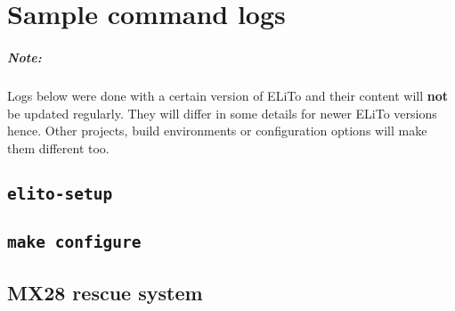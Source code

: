 \chapter{Sample command logs}

\paragraph{Note:}
Logs below were done with a certain version of ELiTo and their content
will \textbf{not} be updated regularly.  They will differ in some
details for newer ELiTo versions hence.  Other projects, build
environments or configuration options will make them different too.

\section[elito-setup]{\texttt{elito-setup}}
\label{app:log:quickstart_elito-setup}


\section[make configure]{\texttt{make configure}}
\label{app:log:quickstart_elito-configure}


\section[MX28 Rescue system]{MX28 rescue system}
\label{app:log:mx28_rescue_system}



